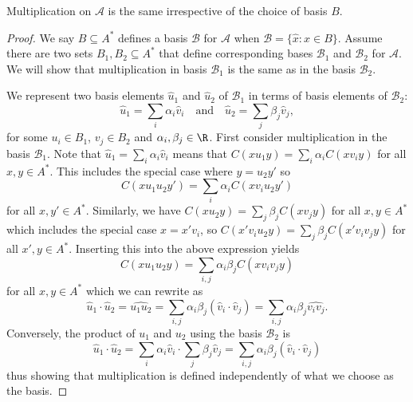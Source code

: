 \begin{prop}
Multiplication on $\mathcal{A}$ is the same irrespective of the choice of basis $B$.
\end{prop}
\begin{proof}

We say $B \subseteq A^*$ defines a basis $\mathcal{B}$ for $\mathcal{A}$ when $\mathcal{B} = \{\hat{x}: x\in B\}$. Assume there are two sets $B_1, B_2 \subseteq A^*$ that define corresponding bases $\mathcal{B}_1$ and $\mathcal{B}_2$ for $\mathcal{A}$. We will show that multiplication in basis $\mathcal{B}_1$ is the same as in the basis $\mathcal{B}_2$.


We represent two basis elements $\hat{u}_1$ and $\hat{u}_2$ of $\mathcal{B}_1$ in terms of basis elements of $\mathcal{B}_2$:
$$\hat{u}_1 = \sum_i \alpha_i \hat{v}_i \quad\text{and}\quad
\hat{u}_2 = \sum_j \beta_j \hat{v}_j,$$
for some $u_i \in B_1$, $v_j \in B_2$ and $\alpha_i, \beta_j  \in \R$.
 First consider multiplication in the basis $\mathcal{B}_1$. Note that $\hat{u}_1 = \sum_i \alpha_i \hat{v}_i$ means that $C(xu_1y) = \sum_i \alpha_i C(xv_iy)$ for all $x,y \in A^*$. This includes the special case where $y = u_2y'$ so $$C(xu_1u_2y') = \sum_i \alpha_i C(xv_iu_2y')$$ for all $x, y' \in A^*$.
Similarly, we have $C(xu_2y) = \sum_j \beta_j C(xv_jy)$ for all $x,y \in A^*$ which includes the special case $x = x'v_i$, so $C(x'v_iu_2y) = \sum_j \beta_j C(x'v_iv_jy)$ for all $x',y \in A^*$. Inserting this into the above expression yields
$$C(xu_1u_2y) = \sum_{i,j} \alpha_i\beta_j C(xv_iv_jy)$$
for all $x,y \in A^*$ which we can rewrite as
$$\hat{u}_1\cdot\hat{u}_2 = \widehat{u_1u_2} = \sum_{i,j}\alpha_i\beta_j (\hat{v}_i\cdot\hat{v}_j)
= \sum_{i,j}\alpha_i\beta_j \widehat{v_iv_j}.$$
Conversely, the product of $u_1$ and $u_2$ using the basis $\mathcal{B}_2$ is
$$\hat{u}_1\cdot \hat{u}_2 = \sum_i \alpha_i \hat{v}_i \cdot \sum_j \beta_j \hat{v}_j =  \sum_{i,j}\alpha_i\beta_j (\hat{v}_i\cdot\hat{v}_j)$$
thus showing that multiplication is defined independently of what we choose as the basis.
\end{proof}

